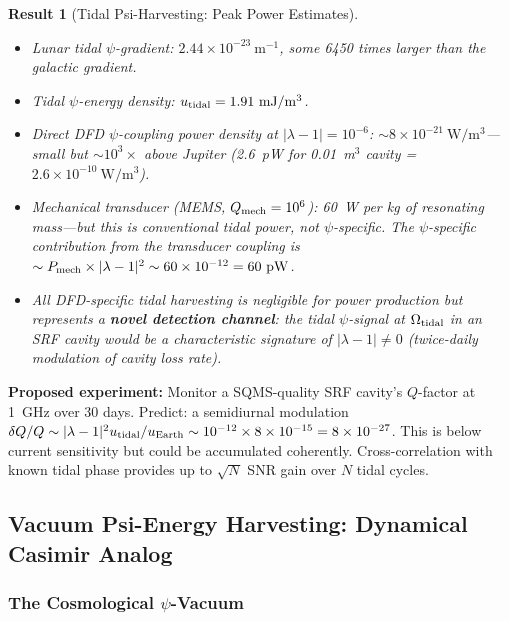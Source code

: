 \documentclass[aps,prd,twocolumn,superscriptaddress]{revtex4-2}
\newcommand{\lam}{|\lambda-1|}
\newtheorem{result}{Result}
\begin{document}
\begin{result}[Tidal Psi-Harvesting: Peak Power Estimates]
\begin{itemize}
\item Lunar tidal $\psi$-gradient: $2.44\times 10^{-23}~\mathrm{m^{-1}}$,
some 6450 times larger than the galactic gradient.
\item Tidal $\psi$-energy density: $u_{\rm tidal} = 1.91~\mathrm{mJ/m^3}$.
\item Direct DFD $\psi$-coupling power density at $\lam = 10^{-6}$:
$\sim 8\times 10^{-21}~\mathrm{W/m^3}$---small but $\sim 10^3\times$
above Jupiter (2.6~pW for 0.01~m$^3$ cavity = $2.6\times 10^{-10}~\mathrm{W/m^3}$).
\item Mechanical transducer (MEMS, $Q_{\rm mech} = 10^6$): 60~W per
kg of resonating mass---but this is conventional tidal power, not
$\psi$-specific.  The $\psi$-specific contribution from the transducer
coupling is $\sim P_{\rm mech}\times\lam^2 \sim 60\times 10^{-12} = 60~\mathrm{pW}$.
\item All DFD-specific tidal harvesting is negligible for power production
but represents a \textbf{novel detection channel}: the tidal $\psi$-signal
at $\Omega_{\rm tidal}$ in an SRF cavity would be a characteristic
signature of $\lam \neq 0$ (twice-daily modulation of cavity loss rate).
\end{itemize}
\end{result}

\textbf{Proposed experiment:}  Monitor a SQMS-quality SRF cavity's
$Q$-factor at 1~GHz over 30 days.  Predict: a semidiurnal modulation
$\delta Q/Q \sim \lam^2 u_{\rm tidal}/u_{\rm Earth} \sim 10^{-12}\times 8\times 10^{-15}
= 8\times 10^{-27}$.  This is below current sensitivity but could be
accumulated coherently.  Cross-correlation with known tidal phase provides
up to $\sqrt{N}$ SNR gain over $N$ tidal cycles.

\subsection{Vacuum Psi-Energy Harvesting: Dynamical Casimir Analog}
\label{sec:vacuum}

\subsubsection{The Cosmological $\psi$-Vacuum}
\end{document}
